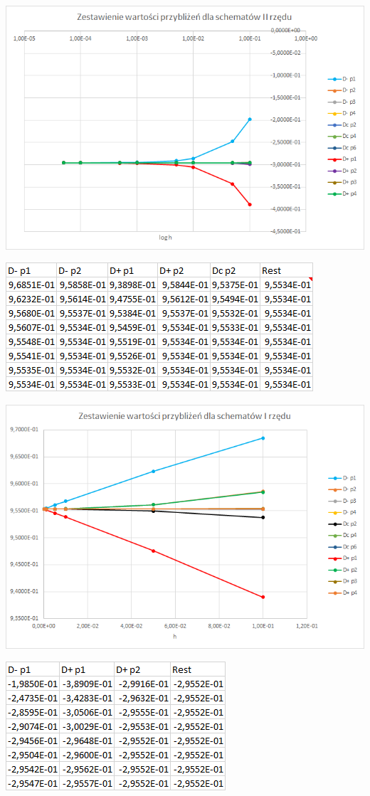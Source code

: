 \includegraphics{Lab2/charts/rz2_log_e.png}
\newpage


\includegraphics{Lab2/charts/rz1_e_dane.png}

\includegraphics{Lab2/charts/rz1_e.png}
\newpage


\includegraphics{Lab2/charts/rz2_e_dane.png}


